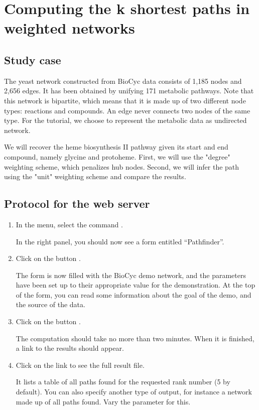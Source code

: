 \section{Computing the k shortest paths in weighted networks}

\subsection{Study case}

The yeast network constructed from BioCyc data consists of 1,185 nodes and 2,656 edges.
It has been obtained by unifying 171 metabolic pathways. Note that this network is bipartite, which means that it is made up of
two different node types: reactions and compounds. An edge never connects two nodes of the same type. For the tutorial, we choose
to represent the metabolic data as undirected network.

We will recover the heme biosynthesis II pathway given its start and end compound, namely glycine and protoheme. First, we will
use the "degree" weighting scheme, which penalizes hub nodes. Second, we will infer the path using the "unit"
weighting scheme and compare the results.

\subsection{Protocol for the web server}

\begin{enumerate}

\item In the \neat  menu, select the command .

  In the right panel, you should now see a form entitled
  ``Pathfinder''.

\item Click on the button .

  The form is now filled with the BioCyc demo network, and the parameters have been
  set up to their appropriate value for the demonstration. At the top
  of the form, you can read some information about the goal of the
  demo, and the source of the data.

\item Click on the button .

  The computation should take no more than two minutes. When it is finished, a link to the results should appear.
  
\item Click on the link to see the full result file.

  It lists a table of all paths found for the requested rank number (5 by default). You can also specify another type of output, for instance a network made up of all paths found. Vary the parameter  for this.

\end{enumerate}

